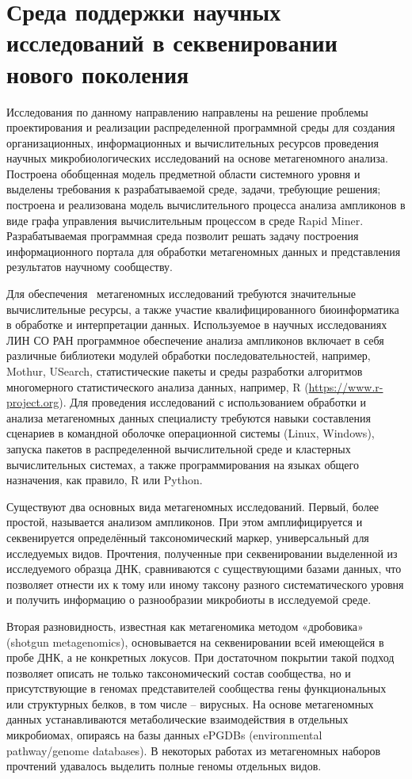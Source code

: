 \documentclass[a4paper,12pt,openany,final]{extreport}
\begin{document}
\chapter{Среда поддержки научных исследований в секвенировании
нового поколения}\label{chap:5}\label{do:cherk}

Исследования по данному направлению направлены на решение проблемы
проектирования и реализации распределенной программной среды для
создания организационных, информационных и вычислительных ресурсов
проведения научных микробиологических исследований на основе
метагеномного анализа. Построена обобщенная модель предметной области
системного уровня и выделены требования к разрабатываемой среде, задачи,
требующие решения; построена и реализована модель вычислительного
процесса анализа ампликонов в виде графа управления вычислительным
процессом в среде Rapid Miner. Разрабатываемая программная среда
позволит решать задачу построения информационного портала для обработки
метагеномных данных и представления результатов научному сообществу.

Для обеспечения~ метагеномных исследований требуются значительные
вычислительные ресурсы, а также участие квалифицированного
биоинформатика в обработке и интерпретации данных. Используемое в
научных исследованиях ЛИН СО РАН программное обеспечение анализа
ампликонов включает в себя различные библиотеки модулей обработки
последовательностей, например, Mothur, USearch, статистические пакеты и
среды разработки алгоритмов многомерного статистического анализа данных,
например, R
(\href{https://www.r-project.org/}{{https://www.r-project.org}}). Для
проведения исследований с использованием обработки и анализа
метагеномных данных специалисту требуются навыки составления сценариев в
командной оболочке операционной системы (Linux, Windows), запуска
пакетов в распределенной вычислительной среде и кластерных
вычислительных системах, а также программирования на языках общего
назначения, как правило, R или Python.

Существуют два основных вида метагеномных исследований. Первый, более
простой, называется анализом ампликонов. При этом амплифицируется и
секвенируется определённый таксономический маркер, универсальный для
исследуемых видов. Прочтения, полученные при секвенировании выделенной
из исследуемого образца ДНК, сравниваются с существующими базами данных,
что позволяет отнести их к тому или иному таксону разного
систематического уровня и получить информацию о разнообразии микробиоты
в исследуемой среде.

Вторая разновидность, известная как метагеномика методом «дробовика»
(shotgun metagenomics), основывается на секвенировании всей имеющейся в
пробе ДНК, а не конкретных локусов. При достаточном покрытии такой
подход позволяет описать не только таксономический состав сообщества, но
и присутствующие в геномах представителей сообщества гены функциональных
или структурных белков, в том числе -- вирусных. На основе метагеномных
данных устанавливаются метаболические взаимодействия в отдельных
микробиомах, опираясь на базы данных ePGDBs (environmental
pathway/genome databases). В некоторых работах из метагеномных наборов
прочтений удавалось выделить полные геномы отдельных видов.
\end{document}
